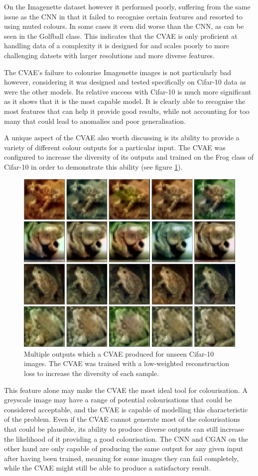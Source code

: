 \documentclass{l4proj}
\begin{document}
On the Imagenette dataset however it performed poorly, suffering from the same issue as the CNN in that it failed to recognise certain features and resorted to using muted colours. In some cases it even did worse than the CNN, as can be seen in the Golfball class. This indicates that the CVAE is only proficient at handling data of a complexity it is designed for and scales poorly to more challenging datsets with larger resolutions and more diverse features.

The CVAE's failure to colourise Imagenette images is not particularly bad however, considering it was designed and tested specifically on Cifar-10 data as were the other models. Its relative success with Cifar-10 is much more significant as it shows that it is the most capable model. It is clearly able to recognise the most features that can help it provide good results, while not accounting for too many that could lead to anomalies and poor generalisation.

A unique aspect of the CVAE also worth discussing is its ability to provide a variety of different colour outputs for a particular input. The CVAE was configured to increase the diversity of its outputs and trained on the Frog class of Cifar-10 in order to demonstrate this ability (see figure \ref{fig:diverseeval}). 

\begin{figure}[H]
    \centering
    \includegraphics[width=0.7\linewidth]{images/DiverseEval.png}    
    \caption{Multiple outputs which a CVAE produced for unseen Cifar-10 images. The CVAE was trained with a low-weighted reconstruction loss to increase the diversity of each sample.}

    \label{fig:diverseeval} 
\end{figure}

This feature alone may make the CVAE the most ideal tool for colourisation. A greyscale image may have a range of potential colourisations that could be considered acceptable, and the CVAE is capable of modelling this characteristic of the problem. Even if the CVAE cannot generate most of the colourisations that could be plausible, its ability to produce diverse outputs can still increase the likelihood of it providing a good colourisation. The CNN and CGAN on the other hand are only capable of producing the same output for any given input after having been trained, meaning for some images they can fail completely, while the CVAE might still be able to produce a satisfactory result.
\end{document}

